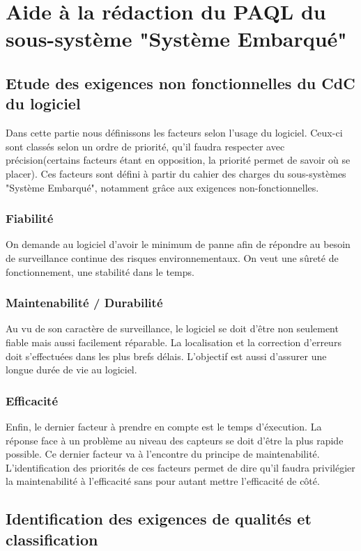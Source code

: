 \section{Aide à la rédaction du PAQL du sous-système "Système Embarqué"}

\subsection{Etude des exigences non fonctionnelles du CdC du logiciel}
Dans cette partie nous définissons les facteurs selon l'usage du logiciel. Ceux-ci sont classés selon un ordre de priorité, qu'il faudra respecter avec précision(certains facteurs étant en opposition, la priorité permet de savoir où se placer). Ces facteurs sont défini à partir du cahier des charges du sous-systèmes "Système Embarqué", notamment grâce aux exigences non-fonctionnelles.

\subsubsection{Fiabilité} 
On demande au logiciel d'avoir le minimum de panne afin de répondre au besoin de surveillance continue des risques environnementaux. On veut une sûreté de fonctionnement, une stabilité dans le temps.

\subsubsection{Maintenabilité / Durabilité}
Au vu de son caractère de surveillance, le logiciel se doit d'être non seulement fiable mais aussi facilement réparable. La localisation et la correction d'erreurs doit s'effectuées dans les plus brefs délais. L'objectif est aussi d'assurer une longue durée de vie au logiciel.

\subsubsection{Efficacité} 
Enfin, le dernier facteur à prendre en compte est le temps d'éxecution. La réponse face à un problème au niveau des capteurs se doit d'être la plus rapide possible.
Ce dernier facteur va à l'encontre du principe de maintenabilité. L'identification des priorités de ces facteurs permet de dire qu'il faudra privilégier la maintenabilité à l'efficacité sans pour autant mettre l'efficacité de côté.


\subsection{Identification des exigences de qualités et classification}